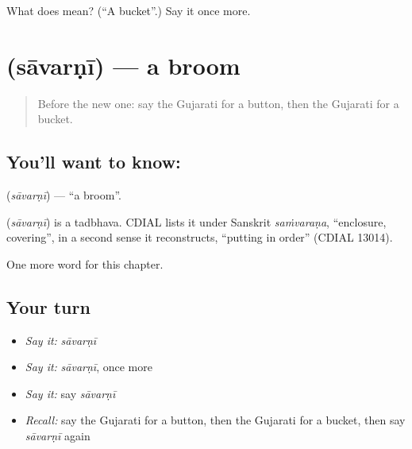 \begin{tcolorbox}[breakable,colback=teal!4,colframe=teal!35!black,title={Before you move on}]
What does  mean? (\textquotedblleft{}A bucket\textquotedblright{}.) Say it once more.
\end{tcolorbox}
\section[\texorpdfstring{\gu{સાવરણી} (sāvarṇī)}{સાવરણી (sāvarṇī)}]{ (sāvarṇī) — a broom}

\label{lesson:GU-C109-savarni}



\begin{quote}
Before the new one: say the Gujarati for a button, then the Gujarati for a bucket.
\end{quote}

\subsection*{You'll want to know: }
\textbf{} (\emph{sāvarṇī}) — \textquotedblleft{}a broom\textquotedblright{}.

\begin{cousinweb}
\textbf{} (\emph{sāvarṇī}) is a tadbhava. CDIAL lists it under Sanskrit \emph{saṁvaraṇa}, \textquotedblleft{}enclosure, covering\textquotedblright{}, in a second sense it reconstructs, \textquotedblleft{}putting in order\textquotedblright{} (CDIAL 13014).
\end{cousinweb}

\begin{grammarlens}[title={What you've built}]
One more word for this chapter.
\end{grammarlens}

\subsection*{Your turn}
\begin{itemize}
\raggedright
  \item \emph{Say it:} \emph{sāvarṇī}
  \item \emph{Say it:} \emph{sāvarṇī}, once more
  \item \emph{Say it:} say \emph{sāvarṇī}
  \item \emph{Recall:} say the Gujarati for a button, then the Gujarati for a bucket, then say \emph{sāvarṇī} again
\end{itemize}

